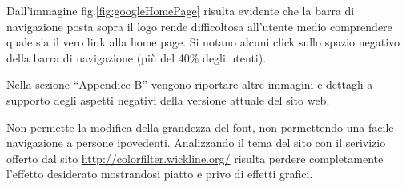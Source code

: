 \documentclass[a4paper,12pt,hidelinks]{report}
\begin{document}
  Dall'immagine fig.\ref{fig:googleHomePage} risulta evidente che la barra di navigazione posta sopra il logo rende difficoltosa all'utente medio comprendere quale sia il vero link alla home page.
  Si notano alcuni click sullo spazio negativo della barra di navigazione (più del 40\% degli utenti).
  \par Nella sezione ``Appendice B'' vengono riportare altre immagini e dettagli a supporto degli aspetti negativi della versione attuale 
  del sito web.
  \par Non permette la modifica della grandezza del font, non permettendo una facile navigazione a persone ipovedenti. Analizzando il tema del sito 
  con il serivizio offerto dal sito \url{http://colorfilter.wickline.org/} risulta perdere completamente l'effetto desiderato mostrandosi piatto 
  e privo di effetti grafici. 
\end{document}
